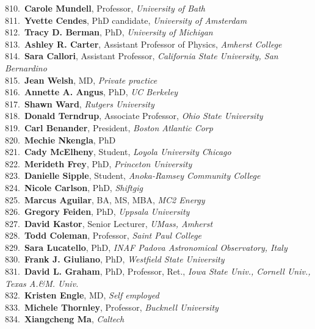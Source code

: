 810.~{\bf Carole Mundell}, Professor, {\sl University of Bath} \\
811.~{\bf Yvette Cendes}, PhD candidate, {\sl University of Amsterdam} \\
812.~{\bf Tracy D. Berman}, PhD, {\sl University of Michigan} \\
813.~{\bf Ashley R. Carter}, Assistant Professor of Physics, {\sl Amherst College} \\
814.~{\bf Sara Callori}, Assistant Professor, {\sl California State University, San Bernardino} \\
815.~{\bf Jean Welsh}, MD, {\sl Private practice } \\
816.~{\bf Annette A. Angus}, PhD, {\sl UC Berkeley} \\
817.~{\bf Shawn Ward}, {\sl Rutgers University} \\
818.~{\bf Donald Terndrup}, Associate Professor, {\sl Ohio State University} \\
819.~{\bf Carl Benander}, President, {\sl Boston Atlantic Corp} \\
820.~{\bf Mechie Nkengla}, PhD \\
821.~{\bf Cady McElheny}, Student, {\sl Loyola University Chicago } \\
822.~{\bf Merideth Frey}, PhD, {\sl Princeton University} \\
823.~{\bf Danielle Sipple}, Student, {\sl Anoka-Ramsey Community College} \\
824.~{\bf Nicole Carlson}, PhD, {\sl Shiftgig} \\
825.~{\bf Marcus Aguilar}, BA, MS, MBA, {\sl MC2 Energy } \\
826.~{\bf Gregory Feiden}, PhD, {\sl Uppsala University} \\
827.~{\bf David Kastor}, Senior Lecturer, {\sl UMass, Amherst} \\
828.~{\bf Todd Coleman}, Professor, {\sl Saint Paul College} \\
829.~{\bf Sara Lucatello}, PhD, {\sl INAF Padova Astronomical Observatory, Italy} \\
830.~{\bf Frank J. Giuliano}, PhD, {\sl Westfield State University} \\
831.~{\bf David L. Graham}, PhD, Professor, Ret., {\sl Iowa State Univ., Cornell Univ., Texas A.\&M. Univ.} \\
832.~{\bf Kristen Engle}, MD, {\sl Self employed} \\
833.~{\bf Michele Thornley}, Professor, {\sl Bucknell University } \\
834.~{\bf Xiangcheng Ma}, {\sl Caltech} \\
